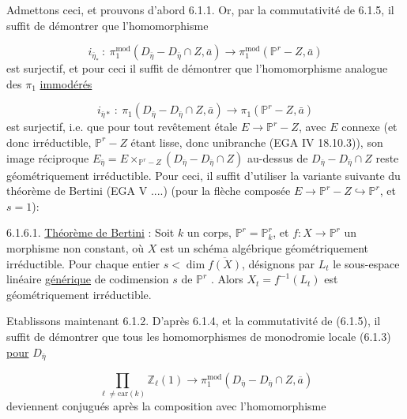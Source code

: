 
Admettons ceci, et prouvons d'abord 6.1.1. Or, par la commutativité de 6.1.5, il suffit de démontrer que l'homomorphisme

\begin{equation*}
i_{\bar{\eta}_*} \ : \ \pi_1^{\mathrm{mod}}(D_{\bar{\eta}} - D_{\bar{\eta}} \cap Z, \bar{a}) \longrightarrow \pi_1^{\mathrm{mod}}(\mathbb{P}^r - Z, \bar{a})
\end{equation*}
est surjectif, et pour ceci il suffit de démontrer que l'homomorphisme analogue des $\pi_1$ \underline{immodérés}

\begin{equation}\tag{6.1.6}
i_{\bar{\eta}*} \ : \ \pi_1(D_{\bar{\eta}} - D_{\bar{\eta}} \cap Z, \bar{a}) \longrightarrow \pi_1(\mathbb{P}^r - Z, \bar{a})
\end{equation}
est surjectif, i.e. que pour tout revêtement étale $E \longrightarrow \mathbb{P}^r - Z$, avec $E$ connexe (et donc irréductible, $\mathbb{P}^r - Z$ étant lisse, donc unibranche (EGA IV 18.10.3)), son image réciproque $E_{\bar{\eta}} = E \times_{\mathbb{P}^r - Z} (D_{\bar{\eta}} - D_{\bar{\eta}} \cap Z)$ au-dessus de $D_{\bar{\eta}} - D_{\bar{\eta}} \cap Z$ reste géométriquement irréductible. Pour ceci, il suffit d'utiliser la variante suivante du théorème de Bertini (EGA V ....) (pour la flèche composée $E \longrightarrow \mathbb{P}^r - Z \hookrightarrow \mathbb{P}^r$, et $s = 1$):

6.1.6.1. \underline{Théorème de Bertini} : Soit $k$ un corps, $\mathbb{P}^r = \mathbb{P}^r_k$, et $f : X \longrightarrow \mathbb{P}^r$ un morphisme non constant, où $X$ est un schéma algébrique géométriquement irréductible. Pour chaque entier $s < \dim \overline{f(X)}$, désignons par $L_t$ le sous-espace linéaire \underline{générique} de codimension $s$ de $\mathbb{P}^r$ . Alors $X_t = f^{-1}(L_t)$ est géométriquement irréductible.

Etablissons maintenant 6.1.2. D'après 6.1.4, et la commutativité de (6.1.5), il suffit de démontrer que tous les homomorphismes de monodromie locale (6.1.3) \underline{pour} $D_{\bar{\eta}}$ 



\begin{equation}\tag{6.1.7.1}
 \prod_{\ell \neq \mathrm{car}(k)} \mathbb{Z}_{\ell}(1) \longrightarrow \pi_1^{\mathrm{mod}}(D_{\overline{\eta}} - D_{\overline{\eta}} \cap Z, \overline{a})
\end{equation}
deviennent conjugués après la composition avec l'homomorphisme

